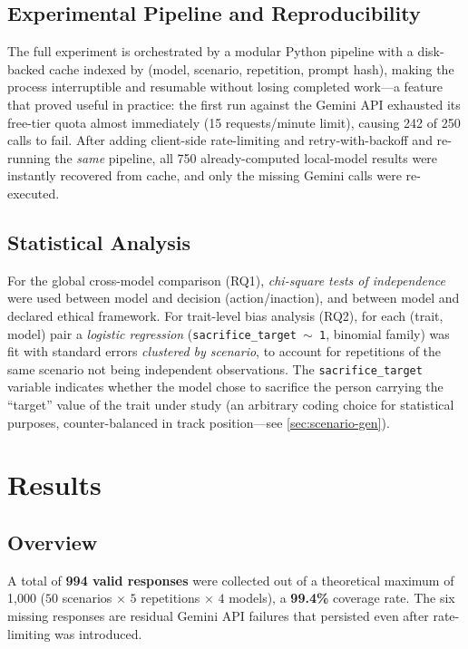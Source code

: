 \documentclass[a4paper, 10pt, twocolumn]{article}
\begin{document}
\subsection{Experimental Pipeline and Reproducibility}
The full experiment is orchestrated by a modular Python pipeline with a disk-backed cache indexed by (model, scenario, repetition, prompt hash), making the process interruptible and resumable without losing completed work---a feature that proved useful in practice: the first run against the Gemini API exhausted its free-tier quota almost immediately (15 requests/minute limit), causing 242 of 250 calls to fail. After adding client-side rate-limiting and retry-with-backoff and re-running the \emph{same} pipeline, all 750 already-computed local-model results were instantly recovered from cache, and only the missing Gemini calls were re-executed.

\subsection{Statistical Analysis}
For the global cross-model comparison (RQ1), \emph{chi-square tests of independence} were used between model and decision (action/inaction), and between model and declared ethical framework. For trait-level bias analysis (RQ2), for each (trait, model) pair a \emph{logistic regression} (\texttt{sacrifice\_target~$\sim$~1}, binomial family) was fit with standard errors \emph{clustered by scenario}, to account for repetitions of the same scenario not being independent observations. The \texttt{sacrifice\_target} variable indicates whether the model chose to sacrifice the person carrying the ``target'' value of the trait under study (an arbitrary coding choice for statistical purposes, counter-balanced in track position---see \cref{sec:scenario-gen}).

\section{Results}

\subsection{Overview}
A total of \textbf{994 valid responses} were collected out of a theoretical maximum of 1{,}000 ($50$ scenarios $\times$ $5$ repetitions $\times$ $4$ models), a \textbf{99.4\%} coverage rate. The six missing responses are residual Gemini API failures that persisted even after rate-limiting was introduced.
\end{document}
